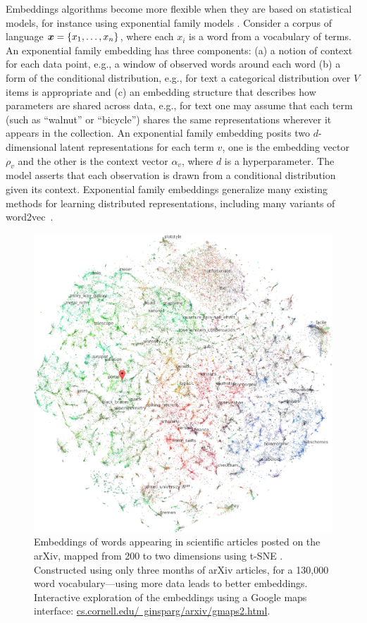 Embeddings algorithms become more flexible when they are based
on statistical models, for instance using exponential family
models \citep{Rudolph:2016b,spherical}.
Consider a corpus of language $\boldsymbol{x} = \{x_1, \ldots, x_n\}$, where
each $x_i$ is a word from a vocabulary of terms. An exponential family
embedding has three components: (a) a notion of context for
each data point, e.g., a window of observed words around each word (b)
a form of the conditional distribution, e.g., for text a
categorical distribution over $V$ items is appropriate and (c) an
embedding structure that describes how parameters are shared
across data, e.g., for text one may assume that each term (such as
``walnut'' or ``bicycle'') shares the same representations wherever it
appears in the collection.
An exponential family embedding
posits two $d$-dimensional latent representations for each term $v$,
one is the embedding vector $\rho_v$ and the other is the
context vector $\alpha_v$, where $d$ is a hyperparameter.  The
model asserts that each observation is drawn from a conditional
distribution given its context. 
Exponential family embeddings generalize many existing methods for
learning distributed representations, including 
many variants of word2vec~\citep{Mikolov:2013}.  


\setlength{\columnsep}{20pt}
\begin{figure}
\centering
\includegraphics[width=.44\textwidth]{figs/ginsparg}
\caption{\small Embeddings of words appearing in scientific articles
posted on the arXiv, mapped from 200 to two dimensions using
t-SNE \citep{ginsparg}. Constructed using only three months of
arXiv articles, for a 130,000 word vocabulary---using more data
leads to better embeddings.
Interactive exploration of the embeddings
using a Google maps interface: \href{http://www.cs.cornell.edu/~ginsparg/arxiv/gmaps2.html}{cs.cornell.edu/~ginsparg/arxiv/gmaps2.html}.
}
    \label{fig:arxiv}
    \vskip2pt
\end{figure}

